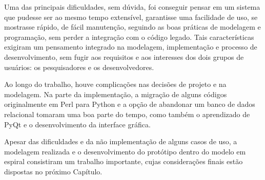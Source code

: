 Uma das principais dificuldades, sem dúvida, foi conseguir pensar em um sistema que pudesse ser ao mesmo tempo extensível, garantisse uma facilidade de uso,
se mostrasse rápido, de fácil manutenção, seguindo as boas práticas de modelagem e programação, sem perder a integração com o código legado. Tais
características exigiram um pensamento integrado na modelagem, implementação e processo de desenvolvimento, sem fugir aos requisitos e aos interesses dos dois
grupos de usuários: os pesquisadores e os desenvolvedores.

Ao longo do trabalho, houve complicações nas decisões de projeto e na modelagem. Na parte da implementação, a migração de alguns códigos originalmente em Perl
para Python e a opção de abandonar um banco de dados relacional tomaram uma boa parte do tempo, como também o aprendizado de PyQt e o desenvolvimento da
interface gráfica.

Apesar das dificuldades e da não implementação de alguns casos de uso, a modelagem realizada e o desenvolvimento do protótipo dentro do modelo em espiral
consistiram um trabalho importante, cujas considerações finais estão dispostas no próximo Capítulo.